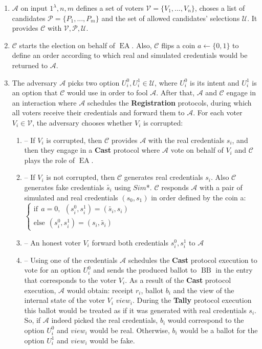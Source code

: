 \documentclass[12pt]{article}
\DeclareMathOperator{\ea}{EA}
\DeclareMathOperator{\bb}{BB}
\begin{document}
\begin{enumerate}
\item $\mathcal{A}$ on input $1^{\lambda},n,m$ defines a set of voters  $\mathcal{V} = \{V_1,...,V_n\}$, choses a list of candidates  $\mathcal{P} = \{P_1,...,P_m\}$ and the set of allowed candidates' selections $\mathcal{U}$.  It provides $\mathcal{C}$ with $\mathcal{V}, \mathcal{P}, \mathcal{U}$.
\item $\mathcal{C}$ starts the election on behalf of $\ea$. Also, $\mathcal{C}$ flips a coin $a \leftarrow \{0,1\}$ to define an order according to which real and simulated credentials would be returned to $\mathcal{A}$. 
\item The adversary $\mathcal{A}$ picks two option $U^0_i,U^1_i \in \mathcal{U}$, where $U^0_i$ is its intent and $U^1_i$ is an option that $\mathcal{C}$ would use in order to fool $\mathcal{A}$.  After that, $\mathcal{A}$  and $\mathcal{C}$ engage in an interaction where $\mathcal{A}$ schedules the \textbf{Registration} protocols, during which all voters receive their credentials and forward them to  $\mathcal{A}$. For each voter $V_i \in \mathcal{V}$, the adversary chooses whether $V_i$ is corrupted:
\begin{enumerate}
\item[] -- If $V_i$ is corrupted, then $\mathcal{C}$ provides $\mathcal{A}$ with the real credentials $s_i$, and then they engage in a \textbf{Cast} protocol where $\mathcal{A}$  vote on behalf of $V_i$ and  $\mathcal{C}$ plays the role of $\ea$.
\item[] --  If $V_i$ is not corrupted, then $\mathcal{C}$ generates real credentials $s_i$. Also $\mathcal{C}$ generates fake credentials $\tilde{s_i}$ using $Sim$*.  $\mathcal{C}$  responds  $\mathcal{A}$ with a pair of simulated and real credentials $(s_0,s_1)$ in order defined by the coin a:
$ \begin{cases}
 \text{if} ~~a =0,~~ (s^0_i,s^1_i) = (\tilde{s_i},s_i)  \\ 
 \text{else}~~  (s^0_i,s^1_i) = (s_i,\tilde{s_i})
\end{cases}$
 \item[] -- An honest voter $V_i$ forward both credentials $s^0_i,s^1_i$ to $\mathcal{A}$
\item[] -- Using one of the credentials $\mathcal{A}$ schedules the \textbf{Cast} protocol execution to vote for an option $U^0_i$ and sends the produced ballot to $\bb$ in the entry that corresponds to the voter $V_i$. As a result of the \textbf{Cast} protocol execution, $\mathcal{A}$ would obtain: receipt $r_i$, ballot $b_i$ and the view of the internal state of the voter $V_i$ $view_i$.  During the \textbf{Tally} protocol execution this ballot would be treated as if it was generated with real credentials $s_i$. So, if  $\mathcal{A}$ indeed picked the real credentials, $b_i$ would correspond to the option   $U^0_i$  and $view_i$ would be real. Otherwise, $b_i$ would be a ballot for the option  $U^1_i$ and $view_i$ would be fake. 

\end{enumerate}
\end{enumerate}
\end{document}
